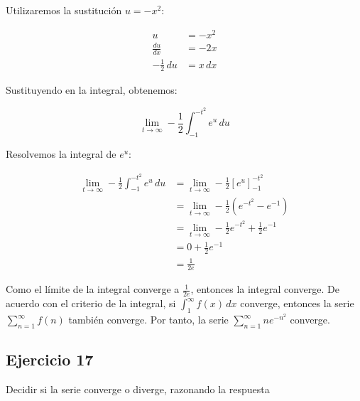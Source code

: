 \documentclass{article}
\begin{document}
    Utilizaremos la sustitución \( u = -x^2 \):

    $$
    \begin{align*}
    u &= -x^{2} \\
    \frac{d u}{d x} &= -2 x \\
    -\frac{1}{2} \, du &= x \, dx
    \end{align*}
    $$

    Sustituyendo en la integral, obtenemos:

    $$
    \lim _{t \rightarrow \infty} -\frac{1}{2} \int_{-1}^{-t^{2}} e^{u} \, du
    $$

    Resolvemos la integral de \( e^u \):

    $$
    \begin{align*}
    \lim _{t \rightarrow \infty} -\frac{1}{2} \int_{-1}^{-t^{2}} e^{u} \, du &= \lim _{t \rightarrow \infty} -\frac{1}{2} \left[ e^{u} \right]_{-1}^{-t^{2}} \\
    &= \lim _{t \rightarrow \infty} -\frac{1}{2} \left( e^{-t^{2}} - e^{-1} \right) \\
    &= \lim _{t \rightarrow \infty} -\frac{1}{2} e^{-t^{2}} + \frac{1}{2} e^{-1} \\
    &= 0 + \frac{1}{2} e^{-1} \\
    &= \frac{1}{2e}
    \end{align*}
    $$

    Como el límite de la integral converge a $\frac{1}{2e}$, entonces la integral converge. De acuerdo con el criterio de la integral, si $\int_{1}^{\infty} f(x) \, dx$ converge, entonces la serie $\sum_{n=1}^{\infty} f(n)$ también converge. Por tanto, la serie $\sum_{n=1}^{\infty} n e^{-n^{2}}$ converge.

    \subsection*{Ejercicio 17}

    Decidir si la serie converge o diverge, razonando la respuesta
\end{document}
